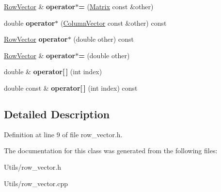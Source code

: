 \begin{DoxyCompactItemize}
\hyperlink{classRowVector}{Row\+Vector} \& {\bfseries operator$\ast$=} (\hyperlink{classMatrix}{Matrix} const \&other)
\item 
\mbox{\label{classRowVector_a39aa97bfe83a14266210ef920fc4ae2e}} 
double {\bfseries operator$\ast$} (\hyperlink{classColumnVector}{Column\+Vector} const \&other) const
\item 
\mbox{\label{classRowVector_a1346204dc2003db81e32935d0b997747}} 
\hyperlink{classRowVector}{Row\+Vector} {\bfseries operator$\ast$} (double other) const
\item 
\mbox{\label{classRowVector_aea8a338f0a33fccbd97370052781b55b}} 
\hyperlink{classRowVector}{Row\+Vector} \& {\bfseries operator$\ast$=} (double other)
\item 
\mbox{\label{classRowVector_a5c22db91fff788c4f325af9658243e72}} 
double \& {\bfseries operator\mbox{[}$\,$\mbox{]}} (int index)
\item 
\mbox{\label{classRowVector_aac012b6ecc5291688842ea4fc5d5233e}} 
double const  \& {\bfseries operator\mbox{[}$\,$\mbox{]}} (int index) const
\end{DoxyCompactItemize}


\subsection{Detailed Description}


Definition at line 9 of file row\+\_\+vector.\+h.



The documentation for this class was generated from the following files\+:\begin{DoxyCompactItemize}
\item 
Utils/row\+\_\+vector.\+h\item 
Utils/row\+\_\+vector.\+cpp\end{DoxyCompactItemize}
